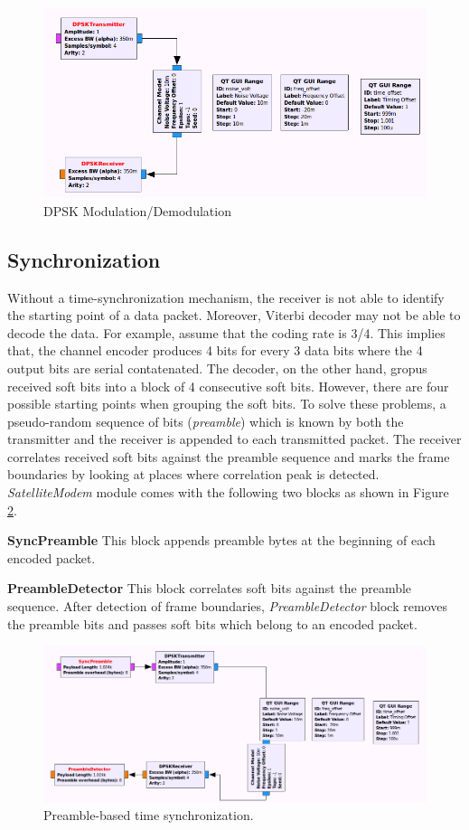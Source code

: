 \documentclass[peerreview,onecolumn]{IEEEtran}
\begin{document}
\begin{figure}[h]
\centering
\includegraphics[width=0.45\columnwidth]{Images/modulation} 
\caption{DPSK Modulation/Demodulation}
\label{fig_modulation}
\end{figure}

\subsection{Synchronization}
Without a time-synchronization mechanism, the receiver is not able to identify the starting point of a data packet. Moreover, Viterbi decoder may not be able to decode the data. For example, assume that the coding rate is 3/4. This implies that, the channel encoder produces 4 bits for every 3 data bits where the 4 output bits are serial contatenated. The decoder, on the other hand, gropus received soft bits into a block of 4 consecutive soft bits. However, there are four possible starting points when grouping the soft bits. To solve these problems, a pseudo-random sequence of bits (\emph{preamble}) which is known by both the transmitter and the receiver is appended to each transmitted packet. The receiver correlates received soft bits against the preamble sequence and marks the frame boundaries by looking at places where correlation peak is detected. \emph{SatelliteModem} module comes with the following two blocks as shown in Figure \ref{fig_preamble}.
\begin{description}
\item \textbf{SyncPreamble} This block appends preamble bytes at the beginning of each encoded packet.
\item \textbf{PreambleDetector} This block correlates soft bits against the preamble sequence. After detection of frame boundaries, \emph{PreambleDetector} block removes the preamble bits and passes soft bits which belong to an encoded packet.
\end{description}

\begin{figure}[h]
\centering
\includegraphics[width=0.5\columnwidth]{Images/preamble} 
\caption{Preamble-based time synchronization.}
\label{fig_preamble}
\end{figure}
\end{document}
